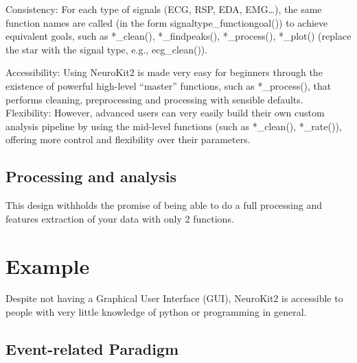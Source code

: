 \documentclass[
  english,
  man,floatsintext]{apa6}
\begin{document}
Consistency: For each type of signals (ECG, RSP, EDA, EMG\ldots), the same function names are called (in the form signaltype\_functiongoal()) to achieve equivalent goals, such as *\_clean(), *\_findpeaks(), *\_process(), *\_plot() (replace the star with the signal type, e.g., ecg\_clean()).

Accessibility: Using NeuroKit2 is made very easy for beginners through the existence of powerful high-level \enquote{master} functions, such as *\_process(), that performs cleaning, preprocessing and processing with sensible defaults.
Flexibility: However, advanced users can very easily build their own custom analysis pipeline by using the mid-level functions (such as *\_clean(), *\_rate()), offering more control and flexibility over their parameters.

\hypertarget{processing-and-analysis}{%
\subsection{Processing and analysis}\label{processing-and-analysis}}

This design withholds the promise of being able to do a full processing and features extraction of your data with only 2 functions.

\hypertarget{example}{%
\section{Example}\label{example}}

Despite not having a Graphical User Interface (GUI), NeuroKit2 is accessible to people with very little knowledge of python or programming in general.

\hypertarget{event-related-paradigm}{%
\subsection{Event-related Paradigm}\label{event-related-paradigm}}
\end{document}
